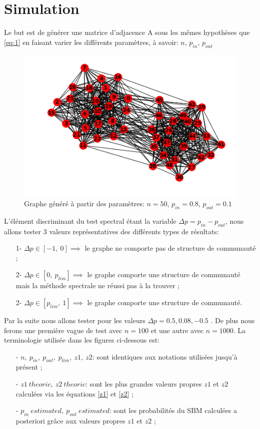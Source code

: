 \section{Simulation}
Le but est de générer une matrice d'adjacence A sous les mêmes hypothèses que \eqref{eq:1} en faisant varier les différents paramètres, à savoir: $n$, $p_{in}$, $p_{out}$ \\

\begin{figure}[h]
\centering
\includegraphics[scale=0.6]{static/graph_n50_pin08_pout01.png}
\caption{Graphe généré à partir des paramètres: $n=50$, $p_{in}=0.8$, $p_{out}=0.1$}
\end{figure}

L'élément discriminant du test spectral étant la variable $ \Delta p= p_{in} - p_{out}$, nous allons tester 3 valeurs représentatives des différents types de résultats:
\begin{itemize}
	\item[1-] $\Delta p \in [-1,\: 0] \implies$ le graphe ne comporte pas de structure de communauté ;
	\item[2-] $\Delta p \in [0,\: p_{lim}] \implies$ le graphe comporte une structure de communauté mais la méthode spectrale ne réussi pas à la trouver ;
	\item[2-] $\Delta p \in [p_{lim},\: 1] \implies$ le graphe comporte une structure de communauté.\\
\end{itemize}

Par la suite nous allons tester pour les valeurs $\Delta p= 0.5, 0.08, -0.5$ .
De plus nous ferons une première vague de test avec $n=100$ et une autre avec $n=1000$.
La terminologie utilisée dans les figures ci-dessous est:
\begin{itemize}
	\item[- \underline{$n,\: p_{in},\: p_{out},\: p_{lim},\: z1,\: z2$}:] sont identiques aux notations utilisées jusqu'à présent ;
	\item[- \underline{$z1\: theoric, \:z2\: theoric$}:] sont les plus grandes valeurs propres $z1$ et $z2$ calculées via les équations \eqref{z1} et \eqref{z2} ;    
	\item[- \underline{$p_{in}\: estimated, \:p_{out}\: estimated$}:] sont les probabilités du SBM calculées a posteriori grâce aux valeurs propres $z1$ et $z2$ ;    
\end{itemize}


